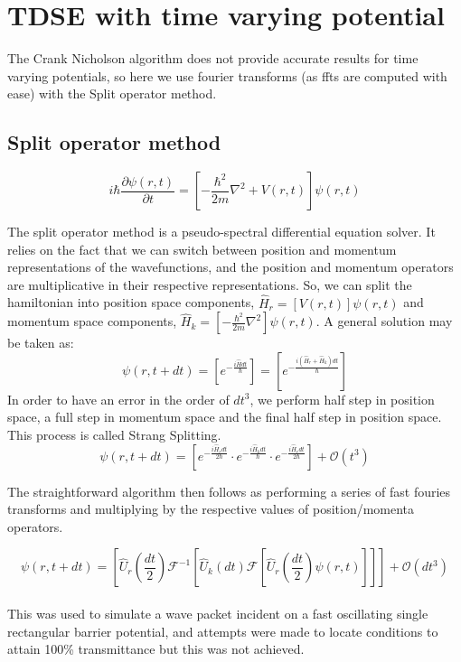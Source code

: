 \documentclass{article}
\begin{document}
\section{TDSE with time varying potential}
The Crank Nicholson algorithm does not provide accurate results for time varying potentials, so here we use fourier transforms (as ffts are computed with ease) with the Split operator method. \cite{fft}

\subsection{Split operator method}

$$ i\hbar\frac{\partial \psi(r,t)}{\partial t} = \left [ -\frac{\hbar^2}{2m}\nabla^2 + V(r,t) \right ] \psi(r,t)$$

The split operator method is a pseudo-spectral differential equation solver. It relies on the fact that we can switch between position and momentum representations of the wavefunctions, and the position and momentum operators are multiplicative in their respective representations. So, we can split the hamiltonian into position space components, $\hat{H}_r = [V(r,t)]\psi(r,t)$ and momentum space components, $\hat{H}_k = \left [ -\frac{\hbar^2}{2m}\nabla^2 \right ] \psi(r,t)$. A general solution may be taken as:
$$\psi(r,t+dt) = \left [ e^{-\frac{i\hat{H}dt}{\hbar}} \right ] = \left [ e^{-\frac{i(\hat{H}_r + \hat{H}_k)dt}{\hbar}} \right ]$$
In order to have an error in the order of $dt^3$, we perform half step in position space, a full step in momentum space and the final half step in position space. This process is called Strang Splitting.
$$\psi(r,t+dt) = \left [ e^{-\frac{i\hat{H}_rdt}{2\hbar}}\cdot e^{-\frac{i\hat{H}_kdt}{\hbar}}\cdot e^{-\frac{i\hat{H}_rdt}{2\hbar}} \right ] + \mathcal{O}(t^3)$$

The straightforward algorithm then follows as performing a series of fast fouries transforms and multiplying by the respective values of position/momenta operators.

$$\psi(r,t+dt) = \left [ \hat{U}_r \left (\frac{dt}{2} \right ) \mathcal{F}^{-1}\left [ \hat{U}_k(dt)\mathcal{F}\left [\hat{U}_r \left (\frac{dt}{2} \right ) \psi(r,t) \right ] \right ] \right ] + \mathcal{O}(dt^3)$$
\\
This was used to simulate a wave packet incident on a fast oscillating single rectangular barrier potential, and attempts were made to locate conditions to attain 100\% transmittance but this was not achieved.
\end{document}
